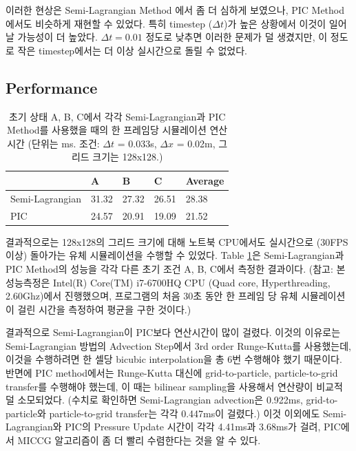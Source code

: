 \documentclass[12pt, A4]{article}
\begin{document}
이러한 현상은 Semi-Lagrangian Method 에서 좀 더 심하게 보였으나, PIC Method에서도 비슷하게 재현할 수 있었다. 특히 timestep ($\Delta t$)가 높은 상황에서 이것이 일어날 가능성이 더 높았다. $\Delta t = 0.01$ 정도로 낮추면 이러한 문제가 덜 생겼지만, 이 정도로 작은 timestep에서는 더 이상 실시간으로 돌릴 수 없었다.
 
\subsection{Performance}

\begin{table}[h]
\centering
\begin{tabular}{|l|l|l|l|l|}
\hline
                & A     & B     & C     & Average \\ \hline
Semi-Lagrangian & 31.32 & 27.32 & 26.51 & 28.38   \\ \hline
PIC             & 24.57 & 20.91 & 19.09 & 21.52   \\ \hline
\end{tabular}
\caption{초기 상태 A, B, C에서 각각 Semi-Lagrangian과 PIC Method를 사용했을 때의 한 프레임당 시뮬레이션 연산 시간 (단위는 ms. 조건: $\Delta t$ = 0.033s, $\Delta x$ = 0.02m, 그리드 크기는 128x128.)}
  \label{performance}
\end{table}

결과적으로는 128x128의 그리드 크기에 대해 노트북 CPU에서도 실시간으로 (30FPS 이상) 돌아가는 유체 시뮬레이션을 수행할 수 있었다. Table \ref{performance}은 Semi-Lagrangian과 PIC Method의 성능을 각각 다른 초기 조건 A, B, C에서 측정한 결과이다. (참고: 본 성능측정은 Intel(R) Core(TM) i7-6700HQ CPU (Quad core, Hyperthreading, 2.60Ghz)에서 진행했으며, 프로그램의 처음 30초 동안 한 프레임 당 유체 시뮬레이션이 걸린 시간을 측정하여 평균을 구한 것이다.)

결과적으로 Semi-Lagrangian이 PIC보다 연산시간이 많이 걸렸다. 이것의 이유로는 Semi-Lagrangian 방법의 Advection Step에서 3rd order Runge-Kutta를 사용했는데, 이것을 수행하려면 한 셀당 bicubic interpolation을 총 6번 수행해야 했기 때문이다. 반면에 PIC method에서는 Runge-Kutta 대신에 grid-to-particle, particle-to-grid transfer를 수행해야 했는데, 이 때는 bilinear sampling을 사용해서 연산량이 비교적 덜 소모되었다. (수치로 확인하면 Semi-Lagrangian advection은 0.922ms, grid-to-particle와 particle-to-grid transfer는 각각 0.447ms이 걸렸다.) 이것 이외에도 Semi-Lagrangian와 PIC의 Pressure Update 시간이 각각 4.41ms과 3.68ms가 걸려, PIC에서 MICCG 알고리즘이 좀 더 빨리 수렴한다는 것을 알 수 있다.
\end{document}
